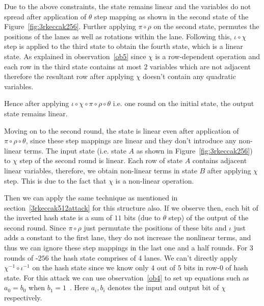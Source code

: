 Due to the above constraints, the state remains linear and the variables do not spread after application of $\theta$ step mapping as shown in the second state of the Figure~\ref{fig:3rkeccak256}. Further applying $\pi \circ \rho$ on the second state, permutes the positions of the lanes as well as rotations within the lane. Following this, $\iota \circ \chi$ step is applied to the third state to obtain the fourth state, which is a linear state. As explained in observation~\ref{ob5} since $\chi$ is a row-dependent operation and each row in the third state contains at most $2$ variables which are not adjacent therefore the resultant row after applying $\chi$ doesn't contain any quadratic variables.

Hence after applying $\iota \circ \chi \circ \pi \circ \rho \circ \theta $ i.e. one round on the initial state, the output state remains linear.

Moving on to the second round, the state is linear even after application of $\pi \circ \rho \circ \theta$, since these step mappings are linear and they don't introduce any non-linear terms. The input state (i.e. state $A$ as shown in Figure~\ref{fig:3rkeccak256}) to $\chi$ step of the second round is linear. Each row of state $A$ contains adjacent linear variables, therefore, we obtain non-linear terms in state $B$ after applying $\chi$ step. This is due to the fact that $\chi$ is a non-linear operation.


Then we can apply the same technique as mentioned in section~\ref{3rkeccak512attack} for this structure also. If we observe then, each bit of the inverted hash state is a sum of $11$ bits (due to $\theta$ step) of the output of the second round. Since $\pi \circ \rho$ just permutate the positions of these bits and $\iota$ just adds a constant to the first lane, they do not increase the nonlinear terms, and thus we can ignore these step mappings in the last one and a half rounds. For $3$ rounds of \Keccak-$256$ the hash state comprises of 4 lanes. We can't directly apply $\chi^{-1} \circ \iota^{-1}$ on the hash state since we know only $4$ out of $5$ bits in row-$0$ of hash state. For this attack we can use observation~\ref{ob4} to set up equations such as $a_0 = b_0$ when $b_1 = 1$~\cite{guo2016linear}. Here $a_i,b_i$ denotes the input and output bit of $\chi$ respectively. 

